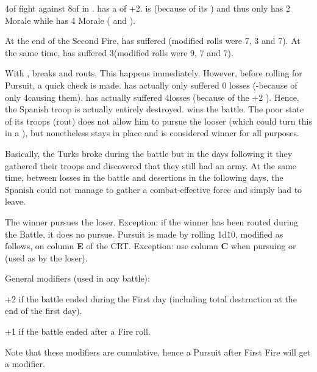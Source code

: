 \begin{exemple}[Destruction]
  4\LD of \HIS fight against 8\LD of \TUR in \TARQ. \TUR has a  of +2. \TUR is  (because of its \Timar) and
  thus only has 2 Morale while \HIS has 4 Morale ( and \TTER).

  At the end of the Second Fire, \TUR has suffered
  \texttd\textetoile\textetoile (modified \HIS rolls were 7, 3 and 7).  At the
  same time, \HIS has suffered 3\textetoile\textetoile\textetoile (modified
  \TUR rolls were 9, 7 and 7).

  With \textetoile\textetoile, \TUR breaks and routs. This happens
  immediately. However, before rolling for Pursuit, a quick check is
  made. \TUR has actually only suffered 0 losses (\texttd-\texttd because of
  only 4\LD causing them). \HIS has actually suffered 4\texttu losses (because
  of the +2 ). Hence, the Spanish troop is actually
  entirely destroyed. \TUR wins the battle. The poor state of its troops
  (rout) does not allow him to pursue the looser (which could turn this in a
  ), but \TUR nonetheless stays in place and is considered
  winner for all purposes.

  Basically, the Turks broke during the battle but in the days following it
  they gathered their troops and discovered that they still had an army. At
  the same time, between losses in the battle and desertions in the following
  days, the Spanish could not manage to gather a combat-effective force and
  simply had to leave.
\end{exemple}

The winner pursues the loser. Exception: if the winner has been routed during
the Battle, it does no pursue. Pursuit is made by rolling 1d10, modified as
follows, on column \textbf{E} of the CRT. Exception: use column \textbf{C}
when pursuing \NTD or \NGD (used as  by the loser).

General modifiers (used in any battle):
\begin{modlist}
\item[+2] if the battle ended during the First day (including total
  destruction at the end of the first day).
\item[+1] if the battle ended after a Fire roll.
\end{modlist}
Note that these modifiers are cumulative, hence a Pursuit after First Fire
will get a  modifier.

